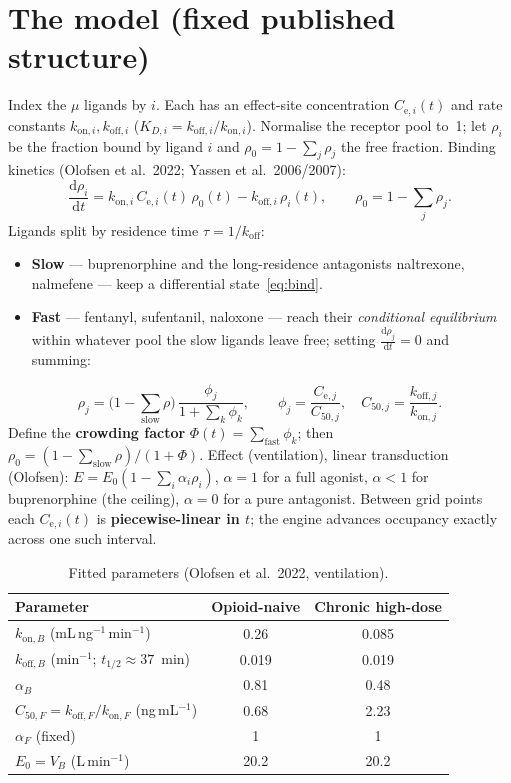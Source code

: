 \documentclass[11pt]{article}
\newcommand{\dd}[2]{\frac{\mathrm{d}#1}{\mathrm{d}#2}}
\newcommand{\Cesub}[1]{C_{\mathrm{e},#1}}
\newcommand{\kon}[1][]{k_{\mathrm{on}#1}}
\newcommand{\koff}[1][]{k_{\mathrm{off}#1}}
\newcommand{\rhoz}{\rho_0}
\begin{document}
\section{The model (fixed published structure)}
\label{sec:model}

Index the $\mu$ ligands by $i$. Each has an effect-site concentration
$\Cesub{i}(t)$ and rate constants $\kon[,i],\koff[,i]$
($K_{D,i}=\koff[,i]/\kon[,i]$). Normalise the receptor pool to~1; let $\rho_i$
be the fraction bound by ligand $i$ and $\rhoz=1-\sum_j\rho_j$ the free
fraction. Binding kinetics (Olofsen et al.\ 2022; Yassen et al.\ 2006/2007):
%
\begin{equation}
\dd{\rho_i}{t}=\kon[,i]\,\Cesub{i}(t)\,\rhoz(t)-\koff[,i]\,\rho_i(t),
\qquad \rhoz=1-\sum_j\rho_j .
\label{eq:bind}
\end{equation}
%
Ligands split by residence time $\tau=1/\koff$:
\begin{itemize}[nosep,leftmargin=1.4em]
\item \textbf{Slow} --- buprenorphine and the long-residence antagonists
naltrexone, nalmefene --- keep a differential state~\eqref{eq:bind}.
\item \textbf{Fast} --- fentanyl, sufentanil, naloxone --- reach their
\emph{conditional equilibrium} within whatever pool the slow ligands leave free;
setting $\dd{\rho_j}{t}=0$ and summing:
\end{itemize}
%
\begin{equation}
\rho_j=\bigl(1-\textstyle\sum_{\mathrm{slow}}\rho\bigr)\,
\frac{\phi_j}{1+\sum_k\phi_k},\qquad
\phi_j=\frac{\Cesub{j}}{C_{50,j}},\quad C_{50,j}=\frac{\koff[,j]}{\kon[,j]}.
\label{eq:qss}
\end{equation}
%
Define the \textbf{crowding factor} $\Phi(t)=\sum_{\mathrm{fast}}\phi_k$; then
$\rhoz=(1-\sum_{\mathrm{slow}}\rho)/(1+\Phi)$. Effect (ventilation), linear
transduction (Olofsen): $E=E_0(1-\sum_i\alpha_i\rho_i)$, $\alpha=1$ for a full
agonist, $\alpha<1$ for buprenorphine (the ceiling), $\alpha=0$ for a pure
antagonist. Between grid points each $\Cesub{i}(t)$ is \textbf{piecewise-linear
in $t$}; the engine advances occupancy exactly across one such interval.

\begin{table}[h]
\centering
\caption{Fitted parameters (Olofsen et al.\ 2022, ventilation).}
\begin{tabular}{lcc}
\toprule
Parameter & Opioid-naive & Chronic high-dose \\
\midrule
$\kon[,B]$ (mL\,ng$^{-1}$\,min$^{-1}$) & 0.26 & 0.085 \\
$\koff[,B]$ (min$^{-1}$; $t_{1/2}\approx37$~min) & 0.019 & 0.019 \\
$\alpha_B$ & 0.81 & 0.48 \\
$C_{50,F}=\koff[,F]/\kon[,F]$ (ng\,mL$^{-1}$) & 0.68 & 2.23 \\
$\alpha_F$ (fixed) & 1 & 1 \\
$E_0=V_B$ (L\,min$^{-1}$) & 20.2 & 20.2 \\
\bottomrule
\end{tabular}
\end{table}
\end{document}
